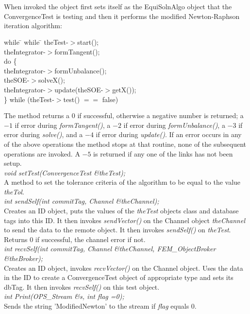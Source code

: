   \\
 \\
When invoked the object first sets itself as the EquiSolnAlgo object
that the ConvergenceTest is testing and then it performs the
modified Newton-Raphson iteration algorithm: 
\begin{tabbing}
while \= \+ while \= \kill
theTest-$>$start(); \\
theIntegrator-$>$formTangent(); \\
do \{ \+ \\
theIntegrator-$>$formUnbalance(); \\
theSOE-$>$solveX(); \\
theIntegrator-$>$update(theSOE-$>$getX()); \- \\
\} while (theTest-$>$test() $==$ false)\- \\
\end{tabbing}


\noindent The method returns a 0 if successful, otherwise a negative number is
returned; a $-1$ if error during {\em formTangent()}, a $-2$ if
error during {\em formUnbalance()}, a $-3$ if error during {\em
solve()}, and a $-4$ if error during {\em update()}.
If an error occurs in any of the above operations the method stops at
that routine, none of the subsequent operations are invoked. A $-5$ is
returned if any one of the links has not been setup.\\

{\em void setTest(ConvergenceTest \&theTest);} \\
A method to set the tolerance criteria of the algorithm to be equal to
the value {\em theTol}. \\

{\em int sendSelf(int commitTag, Channel \&theChannel);}\\
Creates an ID object, puts the values of the {\em theTest} objects
class and database tags into this ID.
It then invokes {\em sendVector()} on the Channel object {\em
theChannel} to send the data to the remote object. It then invokes
{\em sendSelf()} on {\em theTest}. Returns $0$ if successful, the
 channel error if not. \\

{\em int recvSelf(int commitTag, Channel \&theChannel, FEM\_ObjectBroker
\&theBroker);}\\ 
Creates an ID object, invokes {\em recvVector()} on the Channel
object. Uses the data in the ID to create a ConvergenceTest object of
appropriate type and sets its dbTag. It then invokes {\em recvSelf()}
on this test object.  \\

{\em int Print(OPS\_Stream \&s, int flag =0);} \\
Sends the string 'ModifiedNewton' to the stream if {\em flag} equals $0$.
